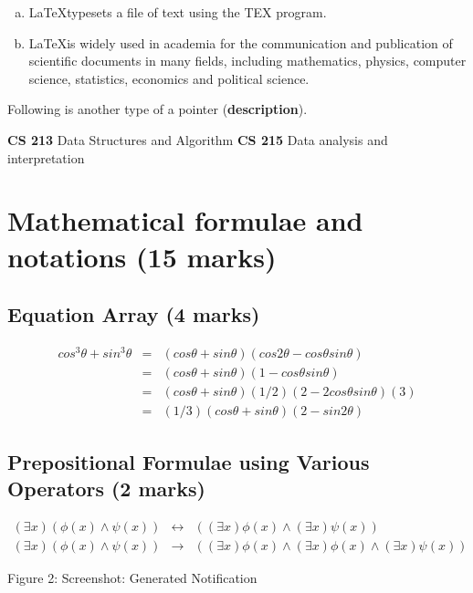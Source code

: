 \documentclass[12pt]{article}
\newcommand{\LATEX}{\LaTeX}
\newcommand{\comment}[1]{}
\begin{document}
\begin{enumerate}[(a)]
\item \LATEX typesets a file of text using the TEX program.
\item \LATEX is widely used in academia for the communication and publication
of scientific documents in many fields, including mathematics, physics,
computer science, statistics, economics and political science.
\end{enumerate}

Following is another type of a pointer (\textbf{description}).


\textbf{CS 213} Data Structures and Algorithm
\textbf{CS 215} Data analysis and interpretation
\newpage

\section{Mathematical formulae and notations (15 marks)}

\subsection{Equation Array (4 marks)}

\begin{eqnarray} \label{eq1}
cos^3\theta + sin^3\theta & = & (cos\theta + sin\theta)(cos2\theta - cos\theta sin\theta) \\
& = & (cos\theta + sin\theta)(1 - cos\theta sin\theta) \\
& = & (cos\theta + sin\theta)(1/2)(2 - 2cos\theta sin\theta)(3) \\
& = & (1/3)(cos\theta + sin\theta)(2-sin2\theta)
\end{eqnarray}

\subsection{Prepositional Formulae using Various Operators (2 marks)}
\begin{eqnarray*}
(\exists x) (\phi(x)\wedge\psi(x)) & \longleftrightarrow & ((\exists x) \phi(x) \wedge (\exists x) \psi(x)) \\
(\exists x)  (\phi(x) \wedge \psi(x)) & \longrightarrow & ((\exists x) \phi(x) \wedge (\exists x) \phi(x) \wedge (\exists x) \psi(x))
\end{eqnarray*}

\comment{
\begin{eqnarray*}
$cos^3θ + sin3
θ = (cosθ + sinθ)(cos2θ − cosθsinθ) (1)
= (cosθ + sinθ)(1 − cosθsinθ) (2)
= (cosθ + sinθ)(1/2)(2 − 2cosθsinθ)(3) (3)
= (1/2)(cosθ + sinθ)(2 − sin(2θ)) (4)$
}
Figure 2: Screenshot: Generated Notification
\end{document}
